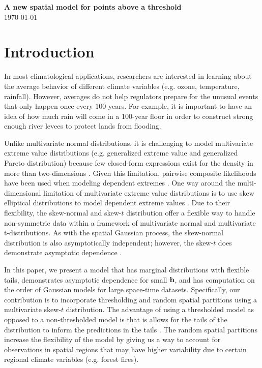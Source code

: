 \documentclass[11pt]{article}
\begin{document}
\linenumbers

\begin{center}
{\Large {\bf A new spatial model for points above a threshold}}\\
\today
\end{center}

\section{Introduction}\label{s:intro}
In most climatological applications, researchers are interested in learning about the average behavior of different climate variables (e.g. ozone, temperature, rainfall).
However, averages do not help regulators prepare for the unusual events that only happen once every 100 years.
For example, it is important to have an idea of how much rain will come in a 100-year floor in order to construct strong enough river levees to protect lands from flooding.

Unlike multivariate normal distributions, it is challenging to model multivariate extreme value distributions (e.g. generalized extreme value and generalized Pareto distribution) because few closed-form expressions exist for the density in more than two-dimensions \citep{Coles1991}.
Given this limitation, pairwise composite likelihoods have been used when modeling dependent extremes \citep{Padoan2010,Blanchet2011,Huser2013}.
One way around the multi-dimensional limitation of multivariate extreme value distributions is to use skew elliptical distributions to model dependent extreme values \citep{Genton2004,Zhang2010,Padoan2011}.
Due to their flexibility, the skew-normal and skew-$t$ distribution offer a flexible way to handle non-symmetric data within a framework of multivariate normal and multivariate t-distributions.
As with the spatial Gaussian process, the skew-normal distribution is also asymptotically independent; however, the skew-$t$ does demonstrate asymptotic dependence \citep{Padoan2011}.

In this paper, we present a model that has marginal distributions with flexible tails, demonstrates asymptotic dependence for small $\mbox{\bf h}$, and has computation on the order of Gaussian models for large space-time datasets.
Specifically, our contribution is to incorporate thresholding and random spatial partitions using a multivariate skew-$t$ distribution.
The advantage of using a thresholded model as opposed to a non-thresholded model is that is allows for the tails of the distribution to inform the predictions in the tails \citep{DuMouchel1983}.
The random spatial partitions increase the flexibility of the model by giving us a way to account for observations in spatial regions that may have higher variability due to certain regional climate variables (e.g. forest fires).
\end{document}
